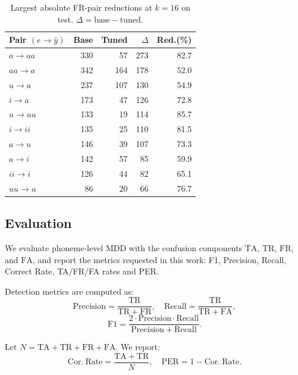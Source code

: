 \documentclass[11pt]{article}
\begin{document}
\begin{table}[t]
  \centering
  \small
  \setlength{\tabcolsep}{4pt}
  \begin{tabular}{lrrrr}
    \hline
    Pair \((e\!\rightarrow\!\hat{y})\) & Base & Tuned & \(\Delta\) & Red.(\%) \\
    \hline
    \(a\!\rightarrow\!aa\) & 330 & 57 & 273 & 82.7 \\
    \(aa\!\rightarrow\!a\) & 342 & 164 & 178 & 52.0 \\
    \(u\!\rightarrow\!a\) & 237 & 107 & 130 & 54.9 \\
    \(i\!\rightarrow\!a\) & 173 & 47 & 126 & 72.8 \\
    \(u\!\rightarrow\!uu\) & 133 & 19 & 114 & 85.7 \\
    \(i\!\rightarrow\!ii\) & 135 & 25 & 110 & 81.5 \\
    \(a\!\rightarrow\!u\) & 146 & 39 & 107 & 73.3 \\
    \(a\!\rightarrow\!i\) & 142 & 57 & 85 & 59.9 \\
    \(ii\!\rightarrow\!i\) & 126 & 44 & 82 & 65.1 \\
    \(uu\!\rightarrow\!u\) & 86 & 20 & 66 & 76.7 \\
    \hline
  \end{tabular}
  \caption{Largest absolute FR-pair reductions at $k{=}16$ on test. \(\Delta\!=\!\text{base}-\text{tuned}\).}
  \label{tab:pair-fr-reduction-k16}
\end{table}

\subsection{Evaluation}
We evaluate phoneme-level MDD with the confusion components \(\mathrm{TA}\), \(\mathrm{TR}\), \(\mathrm{FR}\), and \(\mathrm{FA}\), and report the metrics requested in this work: F1, Precision, Recall, Correct Rate, TA/FR/FA rates and PER.

Detection metrics are computed as:
\begin{equation}
\mathrm{Precision} = \frac{\mathrm{TR}}{\mathrm{TR}+\mathrm{FR}}, \quad
\mathrm{Recall} = \frac{\mathrm{TR}}{\mathrm{TR}+\mathrm{FA}},
\end{equation}
\begin{equation}
\mathrm{F1} = \frac{2 \cdot \mathrm{Precision} \cdot \mathrm{Recall}}{\mathrm{Precision}+\mathrm{Recall}}.
\end{equation}

Let \(N=\mathrm{TA}+\mathrm{TR}+\mathrm{FR}+\mathrm{FA}\). We report:
\begin{equation}
\mathrm{Cor.\ Rate} = \frac{\mathrm{TA}+\mathrm{TR}}{N}, \quad
\mathrm{PER} = 1-\mathrm{Cor.\ Rate}.
\end{equation}
\end{document}
